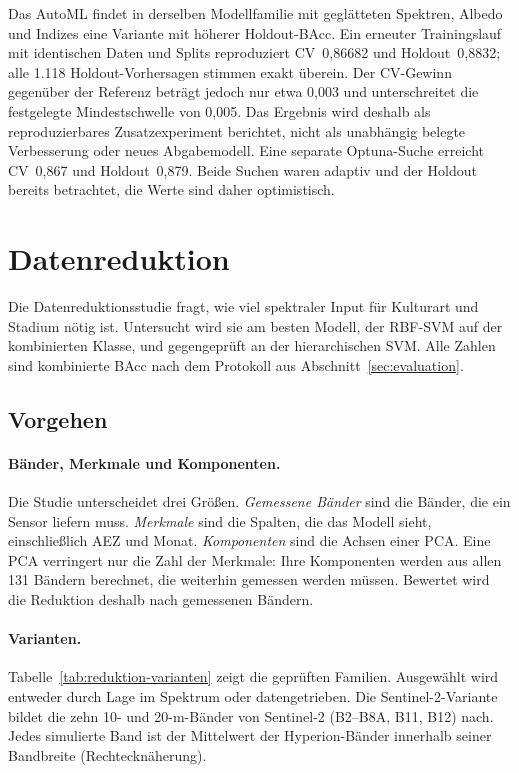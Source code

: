 \documentclass[11pt,a4paper,titlepage]{article}
\begin{document}
Das AutoML findet in derselben Modellfamilie mit gegl\"atteten
Spektren, Albedo und Indizes eine Variante mit h\"oherer Holdout-BAcc. Ein
erneuter Trainingslauf mit identischen Daten und Splits reproduziert
CV~0,86682 und Holdout~0,8832; alle 1.118 Holdout-Vorhersagen stimmen exakt
\"uberein. Der CV-Gewinn gegen\"uber der Referenz betr\"agt jedoch nur etwa
0,003 und unterschreitet die festgelegte Mindestschwelle von 0,005.
Das Ergebnis wird deshalb als reproduzierbares Zusatzexperiment berichtet,
nicht als unabh\"angig belegte Verbesserung oder neues Abgabemodell. Eine
separate Optuna-Suche erreicht CV~0,867 und Holdout~0,879. Beide Suchen waren
adaptiv und der Holdout bereits betrachtet, die Werte sind daher optimistisch.

\section{Datenreduktion}
\label{sec:datenreduktion}

Die Datenreduktionsstudie fragt, wie viel spektraler Input f\"ur Kulturart
und Stadium n\"otig ist. Untersucht wird sie am besten Modell, der RBF-SVM
auf der kombinierten Klasse, und gegengepr\"uft an der hierarchischen SVM.
Alle Zahlen sind kombinierte BAcc nach dem Protokoll aus
Abschnitt~\ref{sec:evaluation}.

\subsection{Vorgehen}

\paragraph{B\"ander, Merkmale und Komponenten.}
Die Studie unterscheidet drei Gr\"o\ss en. \emph{Gemessene B\"ander} sind
die B\"ander, die ein Sensor liefern muss. \emph{Merkmale} sind die Spalten,
die das Modell sieht, einschlie\ss{}lich AEZ und Monat. \emph{Komponenten}
sind die Achsen einer PCA. Eine PCA verringert nur die Zahl der Merkmale:
Ihre Komponenten werden aus allen 131 B\"andern berechnet, die weiterhin
gemessen werden m\"ussen. Bewertet wird die Reduktion deshalb nach
gemessenen B\"andern.

\paragraph{Varianten.}
Tabelle~\ref{tab:reduktion-varianten} zeigt die gepr\"uften Familien.
Ausgew\"ahlt wird entweder durch Lage im Spektrum oder datengetrieben.
Die Sentinel-2-Variante bildet die zehn 10- und 20-m-B\"ander von
Sentinel-2 (B2--B8A, B11, B12) nach. Jedes simulierte Band ist der
Mittelwert der Hyperion-B\"ander innerhalb seiner Bandbreite
(Rechteckn\"aherung).
\end{document}
